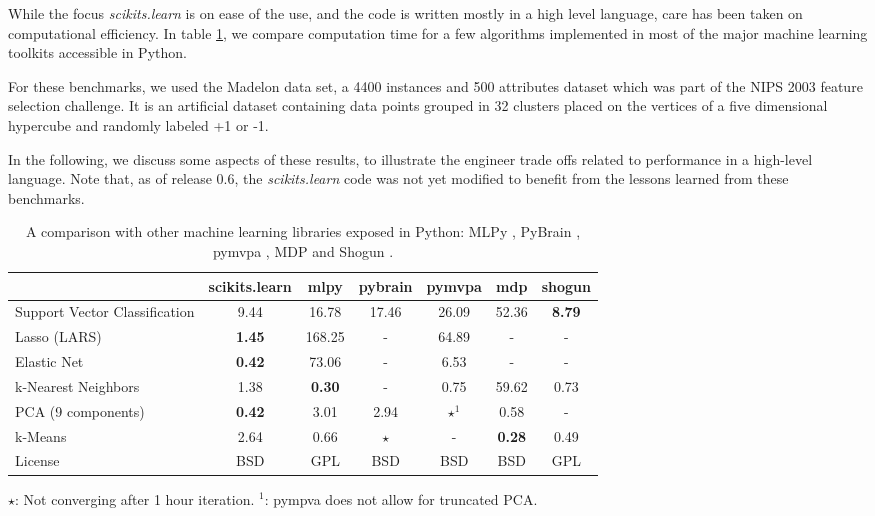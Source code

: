 \documentclass[twoside,11pt]{article}
\begin{document}

While the focus \emph{scikits.learn} is on ease of the use, and the
code is written mostly in a high level language, care has been taken
on computational efficiency. In table \ref{tab:comparisons}, we
compare computation time for a few algorithms implemented in most of
the major machine learning toolkits accessible in Python.  


For these benchmarks, we used the Madelon \citep{Guyon2004} data set,
a 4400 instances and 500 attributes dataset which was part of the NIPS
2003 feature selection challenge. It is an artificial dataset
containing data points grouped in 32 clusters placed on the vertices
of a five dimensional hypercube and randomly labeled +1 or -1.


In the following, we discuss some aspects of these results, to
illustrate the engineer trade offs related to performance in a
high-level language. Note that, as of release 0.6, the
\emph{scikits.learn} code was not yet modified to benefit from the
lessons learned from these benchmarks.

\begin{table}[tb]
\small
\hspace*{.03\linewidth}%
\begin{tabular}{l c c c c c c}
\hline\hline %
 & scikits.learn & mlpy & pybrain & pymvpa &  mdp & shogun \\ [0.5ex]
\hline
Support Vector Classification & 9.44 & 16.78 & 17.46 & 26.09 & 52.36 & {\bf 8.79} \\
Lasso (LARS) & {\bf 1.45} & 168.25   & -       &  64.89     & -    & - \\
Elastic Net & {\bf 0.42} & 73.06 & -  &  6.53  & -  & - \\
k-Nearest Neighbors & 1.38 & {\bf 0.30}  & - &  0.75 & 59.62    & 0.73 \\
PCA (9 components) & {\bf 0.42} & 3.01  & 2.94  & $\star^1$ & 0.58  & - \\
k-Means  & 2.64 & 0.66 & $\star$ & -  & {\bf 0.28} & 0.49 \\
License &  BSD & GPL & BSD  &  BSD  & BSD  & GPL \\
\hline
\end{tabular}

$\star$: Not converging after 1 hour iteration. \hfill $^1$: pympva does
not allow for truncated PCA.
\vspace*{-1ex}
\caption{\small
A comparison with other machine learning libraries exposed in Python:
MLPy \citep{albanese2008}, PyBrain \citep{schaul2010}, pymvpa
\citep{hanke2009}, MDP \citep{zito2008} and Shogun
\citep{sonnenburg2010}. \label{tab:comparisons}}
\end{table}
\end{document}
